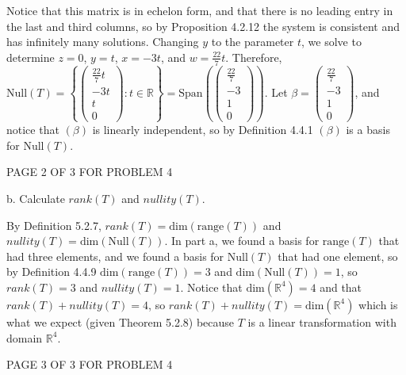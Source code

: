 \documentclass[12pt]{article}
\newenvironment{solution}[1][Solution]
{
	\begin{trivlist} 
		\item[\hskip \labelsep {\itshape #1:}]
	}
	{
	\end{trivlist}
}
\begin{document}
Notice that this matrix is in echelon form, and that there is no leading entry in the last and third columns, so by Proposition 4.2.12 the system is consistent and has infinitely many solutions. Changing $y$ to the parameter $t$, we solve to determine $z=0$, $y=t$, $x=-3t$, and $w=\frac{22}{7}t$. Therefore, $\text{Null}(T)=\left\{ \begin{pmatrix}\frac{22}{7}t\\-3t\\t\\0\end{pmatrix}:t\in\mathbb{R}\right\}=\text{Span}\left( \begin{pmatrix}\frac{22}{7}\\-3\\1\\0\end{pmatrix} \right)$. Let $\beta =\begin{pmatrix}\frac{22}{7}\\-3\\1\\0\end{pmatrix}$, and notice that $(\beta)$ is linearly independent, so by Definition 4.4.1 $(\beta)$ is a basis for $\text{Null}(T)$.
\vfill
\centerline{PAGE 2 OF 3 FOR PROBLEM 4}
%
%
%
\newpage
b. Calculate $rank(T)$ and $nullity(T)$.
\begin{solution}
By Definition 5.2.7, $rank(T)=\text{dim$(\text{range}(T))$}$ and $nullity(T)=\text{dim$(\text{Null}(T))$}$. In part a, we found a basis for $\text{range}(T)$ that had three elements, and we found a basis for $\text{Null}(T)$ that had one element, so by Definition 4.4.9 $\text{dim$(\text{range}(T))$} =3$ and $\text{dim$(\text{Null}(T))$}=1$, so $rank(T)=3$ and $nullity(T)=1$. Notice that $\text{dim}(\mathbb{R}^4)=4$ and that $rank(T)+nullity(T)=4$, so $rank(T)+nullity(T)=\text{dim}(\mathbb{R}^4)$ which is what we expect (given Theorem 5.2.8) because $T$ is a linear transformation with domain $\mathbb{R}^4$.
\end{solution}
\vfill
\centerline{PAGE 3 OF 3 FOR PROBLEM 4}
\end{document}

